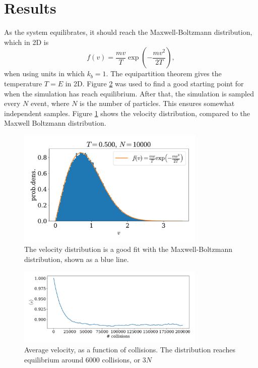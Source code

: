 \documentclass{article}
\begin{document}
        \section*{Results}
            As the system equilibrates, it should reach the Maxwell-Boltzmann distribution, which in 2D is
            \begin{equation*}
                f(v) = \frac{m v}{T} \exp \left(-\frac{m v^2}{2 T}\right),
            \end{equation*}
            when using units in which $k_b = 1$. The equipartition theorem gives the temperature $T = E$ in 2D. Figure \ref{problem1 av vel} was used to find a good starting point for when the simulation has reach equilibrium. After that, the simulation is sampled every $N$ event, where $N$ is the number of particles. This ensures somewhat independent samples. Figure \ref{problem1 dist} shows the velocity distribution, compared to the Maxwell Boltzmann distribution. 
            \begin{figure}
                \centering
                \includegraphics[width=0.8\textwidth]{../plots/problem1/vel_dist.pdf}
                \caption{The velocity distribution is a good fit with the Maxwell-Boltzmann distribution, shown as a blue line.}
                \label{problem1 dist}
            \end{figure}
            \begin{figure}
                \centering
                \includegraphics[width=0.8\textwidth]{../plots/problem1/v_av.pdf}
                \caption{Average velocity, as a function of collisions. The distribution reaches equilibrium around $6000$ collisions, or $3N$}
                \label{problem1 av vel}
            \end{figure}
\end{document}
